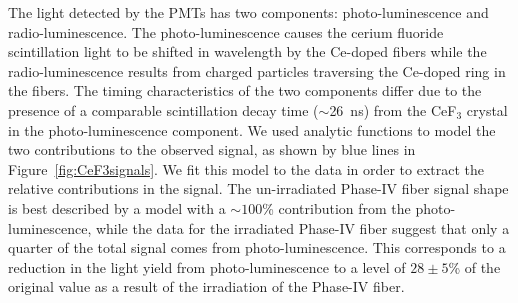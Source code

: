 \documentclass[a4paper,11pt]{article}
\begin{document}
The light detected by the PMTs has two components: photo-luminescence and radio-luminescen\-ce. The photo-luminescence causes the cerium fluoride scintillation light to be shifted in wavelength by the Ce-doped fibers while the radio-lumines\-cen\-ce results from charged particles traversing the Ce-doped ring in the fibers. The timing characteristics of the two components differ due to the presence of a comparable scintillation decay time ($\sim$26~ns) from the CeF$_3$ crystal in the photo-luminescence component. We used analytic functions to model the two contributions to the observed signal, as shown by blue lines in Figure~\ref{fig:CeF3signals}. We fit this model to the data in order to extract the relative contributions in the signal. The un-irradiated Phase-IV fiber signal shape is best described by a model with a $\sim100$\% contribution from the photo-luminescence, while the data for the irradiated Phase-IV fiber suggest that only a quarter of the total signal comes from photo-luminescence. This corresponds to a reduction in the light yield from photo-luminescence to a level of $28 \pm 5$\% of the original value as a result of the irradiation of the Phase-IV fiber. 
\end{document}
